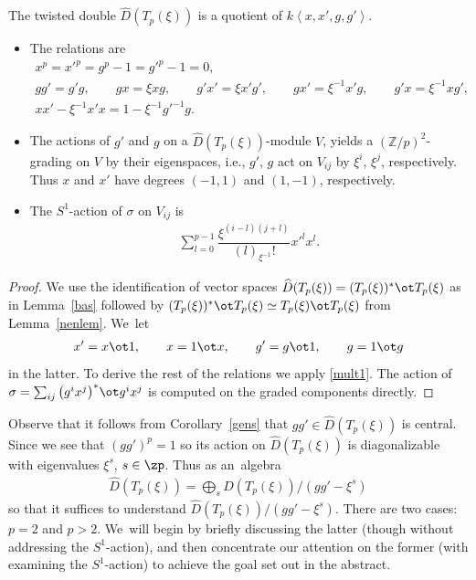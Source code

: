 \begin{Corollary}\label{gens}The twisted double $\widehat{D}(T_p(\xi))$ is a quotient of $k\left\langle x,x',g,g'\right\rangle.$

\begin{itemize}\itemsep=0pt
\item The relations are
\begin{gather*}
x^p=x'^p=g^p-1=g'^p-1=0,
\\
gg'=g'g,\qquad
gx=\xi xg,\qquad
g'x'=\xi x'g',\qquad
gx'=\xi^{-1} x'g, \qquad
g'x=\xi^{-1} xg',
\\
xx'-\xi^{-1}x'x=1-\xi^{-1}g'^{-1}g.
\end{gather*}

\item The actions of $g'$ and $g$ on a $\widehat{D}(T_p(\xi))$-module $V$, yields a $(\mathbb{Z}/p)^2$-grading on $V$ by their eigenspaces, i.e., $g'$, $g$ act on $V_{ij}$ by $\xi^i$, $\xi^j$, respectively. Thus $x$ and $x'$ have degrees $(-1,1)$ and $(1,-1)$, respectively.

\item The $S^1$-action of $\sigma$ on $V_{ij}$ is
\begin{gather}\label{sigmaaction}
\sum_{l=0}^{p-1}\dfrac{\xi^{(i-l)(j+l)}}{(l)_{\xi^{-1}}!}x'^lx^l.
\end{gather}
\end{itemize}
\end{Corollary}

\begin{proof}
We use the identification of vector spaces $\widehat{D}(T_p(\xi))=(T_p(\xi))^*\ot T_p(\xi)$ as in Lemma~\ref{bas} followed by $(T_p(\xi))^*\ot T_p(\xi) \simeq T_p(\xi)\ot T_p(\xi)$ from Lemma~\ref{nenlem}. We~let
\begin{gather}
x'=x\ot 1, \qquad
x=1\ot x, \qquad
g'=g\ot 1, \qquad
g=1\ot g
\end{gather}
in the latter. To derive the rest of the relations we apply \eqref{mult1}. The action of $\sigma=\sum_{ij}\big(g^ix^j\big)^*\ot g^ix^j$ is computed on the graded components directly.
\end{proof}

Observe that it follows from Corollary~\ref{gens} that $gg'\in\widehat{D}(T_p(\xi))$ is central. Since we see that $(gg')^p=1$ so its action on $\widehat{D}(T_p(\xi))$ is diagonalizable with eigenvalues $\xi^s$, $s\in\zp$. Thus as an~algebra
\begin{gather}\label{split}
\widehat{D}(T_p(\xi))=\bigoplus_s \widehat{D}(T_p(\xi))/(gg'-\xi^s)
\end{gather}
so that it suffices to understand $\widehat{D}(T_p(\xi))/(gg'-\xi^s)$. There are two cases: $p=2$ and $p>2$. We~will begin by briefly discussing the latter (though without addressing the $S^1$-action), and then concentrate our attention on the former (with examining the $S^1$-action) to achieve the goal set out in the abstract.

